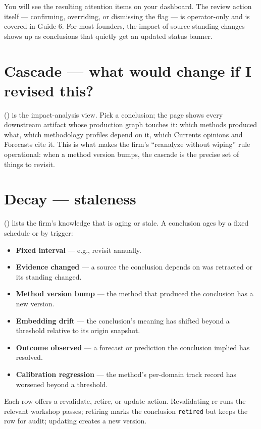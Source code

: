\documentclass[11pt]{article}
\begin{document}
You will see the resulting attention items on your dashboard. The
review action itself --- confirming, overriding, or dismissing the
flag --- is operator-only and is covered in Guide 6. For most
founders, the impact of source-standing changes shows up as
conclusions that quietly get an updated status banner.

\section{Cascade --- what would change if I revised this?}

 () is the impact-analysis
view. Pick a conclusion; the page shows every downstream artifact
whose production graph touches it: which methods produced what, which
methodology profiles depend on it, which Currents opinions and
Forecasts cite it. This is what makes the firm's ``reanalyze without
wiping'' rule operational: when a method version bumps, the cascade is
the precise set of things to revisit.

\section{Decay --- staleness}

 () lists the firm's knowledge that is aging
or stale. A conclusion ages by a fixed schedule or by trigger:

\begin{itemize}[leftmargin=*,itemsep=0.2em]
  \item \textbf{Fixed interval} --- e.g., revisit annually.
  \item \textbf{Evidence changed} --- a source the conclusion depends
        on was retracted or its standing changed.
  \item \textbf{Method version bump} --- the method that produced the
        conclusion has a new version.
  \item \textbf{Embedding drift} --- the conclusion's meaning has
        shifted beyond a threshold relative to its origin snapshot.
  \item \textbf{Outcome observed} --- a forecast or prediction the
        conclusion implied has resolved.
  \item \textbf{Calibration regression} --- the method's per-domain
        track record has worsened beyond a threshold.
\end{itemize}

Each row offers a revalidate, retire, or update action. Revalidating
re-runs the relevant workshop passes; retiring marks the conclusion
\texttt{retired} but keeps the row for audit; updating creates a new
version.
\end{document}
